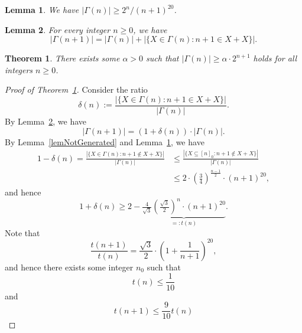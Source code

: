 \documentclass[10pt,a4paper]{amsart}
\newtheorem{theorem}{Theorem}
\newtheorem{lemma}{Lemma}
\begin{document}
\begin{lemma}
    \label{lemFirstLowerBound}
    We have $|\Gamma(n)| \ge 2^n / (n+1)^{20}$.
\end{lemma}

\begin{lemma}
    \label{lemRecurrence}
    For every integer $n \ge 0$, we have
    \[
        |\Gamma(n+1)| = |\Gamma(n)| + |\{X\in \Gamma(n) : n + 1 \in X+X\}|.
    \]
\end{lemma}

\begin{theorem}
    \label{thmMain}
    There exists some $\alpha > 0$ such that $|\Gamma(n)| \ge \alpha \cdot 2^{n+1}$ holds for all integers $n \ge 0$.
\end{theorem}

\begin{proof}[Proof of Theorem~\ref{thmMain}]
    Consider the ratio
    \[
        \delta(n) := \frac{|\{X \in \Gamma(n) : n + 1 \in X + X\}|}{|\Gamma(n)|}.
    \]
    By Lemma~\ref{lemRecurrence}, we have
    \begin{equation}
        \label{eqRecurrenceDelta}
        |\Gamma(n+1)| = (1 + \delta(n)) \cdot |\Gamma(n)|.
    \end{equation}
    By Lemma~\ref{lemNotGenerated} and Lemma~\ref{lemFirstLowerBound}, we have
    \begin{align*}
        1 - \delta(n)
        = \frac{|\{X \in \Gamma(n) : n + 1 \notin X + X\}|}{|\Gamma(n)|}
        & \le \frac{|\{X \subseteq [n]_0 : n + 1 \notin X + X\}|}{|\Gamma(n)|} \\
        & \le 2 \cdot \left( \frac{3}{4} \right)^{\frac{n-1}{2}} \cdot (n+1)^{20},
    \end{align*}
    and hence
    \begin{equation}
        \label{eqDeltaBound}
        1 + \delta(n) \ge 2 - \underbrace{\tfrac{4}{\sqrt{3}} \left( \tfrac{\sqrt{3}}{2} \right)^n \cdot (n+1)^{20}}_{=: t(n)}.
    \end{equation}
    Note that
    \[
        \frac{t(n+1)}{t(n)} = \frac{\sqrt{3}}{2} \cdot \left( 1 + \frac{1}{n+1} \right)^{20},
    \]
    and hence there exists some integer $n_0$ such that
    \begin{equation}
        \label{eqLe1}
        t(n) \le \frac{1}{10}
    \end{equation}
    and
    \begin{equation}
        \label{eqGeometricDecay}
        t(n + 1) \le \frac{9}{10} t(n)
    \end{equation}

\end{proof}
\end{document}
